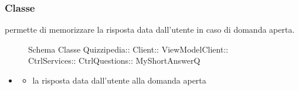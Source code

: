 \subsubsection{Classe }
permette di memorizzare la risposta data dall'utente in caso di domanda aperta.
\begin{figure}[H]
\centering
\noindent{}
\caption[Schema Classe MyShortAnswerQ]{Schema Classe Quizzipedia:: Client:: ViewModelClient:: CtrlServices:: CtrlQuestions:: MyShortAnswerQ}
\end{figure}
\begin{itemize}
\item {}
\begin{itemize}
\item {}
\newline
la risposta data dall'utente alla domanda aperta
\end{itemize}
\end{itemize}
